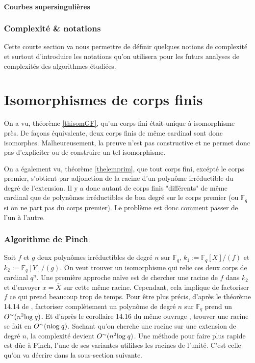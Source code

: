\documentclass[a4paper]{article} %
\numberwithin{section}{part}
\numberwithin{equation}{section}
\newcommand\GF[1]{\mathbb{F}_{#1}}
\begin{document}
\subsection{Courbes supersingulières}

\section{Complexité \& notations}
Cette courte section va nous permettre de définir quelques notions de complexité
et surtout d'introduire les notations qu'on utilisera pour les futurs analyses
de complexités des algorithmes étudiées.

\part{Isomorphismes de corps finis}
\label{deux}
On a vu, théorème \ref{thisomGF}, qu'un corps fini était unique à isomorphisme
près. De façons équivalente, deux corps finis de même cardinal sont donc 
isomorphes. Malheureusement, la preuve n'est pas constructive et ne permet donc 
pas d'expliciter ou de construire un tel isomorphisme.\par
On a également vu, théorème \ref{thelemprim}, que tout corps fini, excépté le 
corps premier, s'obtient par adjonction de la racine d'un polynôme irréductible
du degré de l'extension. Il y a donc autant de corps finis "différents" de même
cardinal que de polynômes irréductibles de bon degré sur le corps premier (ou 
$\GF{q}$ si on ne part pas du corps premier). Le problème est donc comment 
passer de l'un à l'autre.\par

\section{Algorithme de Pinch}
Soit $f$ et $g$ deux polynômes irréductibles de degré $n$ sur $\GF{q}$, 
$k_1 := \GF{q}[X]/(f)$ et $k_2 := \GF{q}[Y]/(g)$. On veut trouver un 
isomorphisme qui relie ces deux corps de cardinal $q^n$. Une première approche 
naïve est de chercher une racine de $f$ dans $k_2$ et d'envoyer $x = \bar{X}$
sur cette même racine. Cependant, cela implique de factoriser $f$ ce qui prend
beaucoup trop de temps. Pour être plus précis, d'après le théorème 14.14 de
\cite[p.~390]{GaGe}, factoriser complètement un polynôme de degré $n$ sur 
$\GF{q}$ prend un $O^{\sim}(n^2\textup{log\;}q)$. Et d'après le corollaire 14.16
du même ouvrage \cite[p.~392]{GaGe}, trouver une racine se fait en
$O^{\sim}(n\textup{log\;}q)$. Sachant qu'on cherche une racine sur une 
extension de degré $n$, la complexité devient $O^{\sim}(n^2\textup{log\;}q)$.
Une méthode pour faire plus rapide est dûe à Pinch, l'une de ses variantes
utililses les racines de l'unité. C'est celle qu'on va décrire dans la
sous-section suivante.
\end{document}
